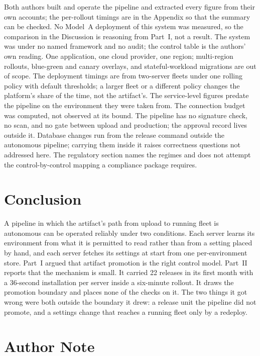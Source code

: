 \documentclass[11pt]{article}
\begin{document}
Both authors built and operate the pipeline and extracted every figure from their own accounts; the per-rollout timings are in the Appendix so that the summary can be checked. No Model~A deployment of this system was measured, so the comparison in the Discussion is reasoning from Part~I, not a result. The system was under no named framework and no audit; the control table is the authors' own reading. One application, one cloud provider, one region; multi-region rollouts, blue-green and canary overlays, and stateful-workload migrations are out of scope. The deployment timings are from two-server fleets under one rolling policy with default thresholds; a larger fleet or a different policy changes the platform's share of the time, not the artifact's. The service-level figures predate the pipeline on the environment they were taken from. The connection budget was computed, not observed at its bound. The pipeline has no signature check, no scan, and no gate between upload and production; the approval record lives outside it. Database changes run from the release command outside the autonomous pipeline; carrying them inside it raises correctness questions not addressed here. The regulatory section names the regimes and does not attempt the control-by-control mapping a compliance package requires.

\section{Conclusion}

A pipeline in which the artifact's path from upload to running fleet is autonomous can be operated reliably under two conditions. Each server learns its environment from what it is permitted to read rather than from a setting placed by hand, and each server fetches its settings at start from one per-environment store. Part~I argued that artifact promotion is the right control model. Part~II reports that the mechanism is small. It carried 22 releases in its first month with a 36-second installation per server inside a six-minute rollout. It draws the promotion boundary and places none of the checks on it. The two things it got wrong were both outside the boundary it drew: a release unit the pipeline did not promote, and a settings change that reaches a running fleet only by a redeploy.

\section*{Author Note}
\end{document}

